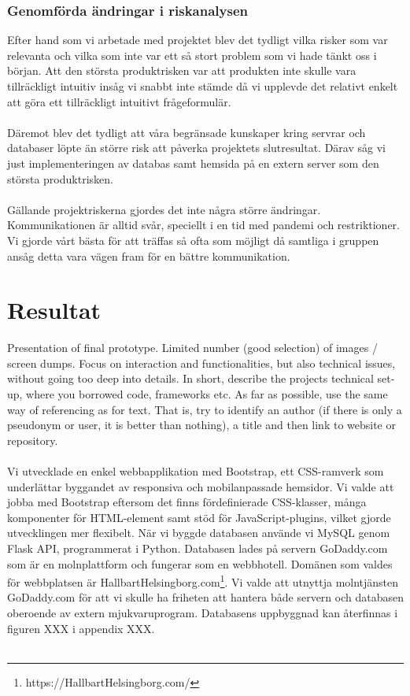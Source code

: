 \documentclass[12pt]{article}
\begin{document}
 \subsubsection{Genomförda ändringar i riskanalysen}Efter hand som vi arbetade med projektet blev det tydligt vilka risker som var relevanta och vilka som inte var ett så stort problem som vi hade tänkt oss i början. Att den största produktrisken var att produkten inte skulle vara tillräckligt intuitiv insåg vi snabbt inte stämde då vi upplevde det relativt enkelt att göra ett tillräckligt intuitivt frågeformulär.\\\\
 Däremot blev det tydligt att våra begränsade kunskaper kring servrar och databaser löpte än större risk att påverka projektets slutresultat. Därav såg vi just implementeringen av databas samt hemsida på en extern server som den största produktrisken.\\\\
 Gällande projektriskerna gjordes det inte några större ändringar. Kommunikationen är alltid svår, speciellt i en tid med pandemi och restriktioner. Vi gjorde vårt bästa för att träffas så ofta som möjligt då samtliga i gruppen ansåg detta vara vägen fram för en bättre kommunikation. 
 

 



\section{Resultat}
Presentation of final prototype. Limited number (good selection) of images / screen dumps. Focus on interaction and functionalities, but also technical issues, without going too deep into details. In short, describe the projects technical set-up, where you borrowed code, frameworks etc. As far as possible, use the same way of referencing as for text. That is, try to identify an author (if there is only a pseudonym or user, it is better than nothing), a title and then link to website or repository.\\\\

Vi utvecklade en enkel webbapplikation med Bootstrap, ett CSS-ramverk som underlättar byggandet av responsiva och mobilanpassade hemsidor. Vi valde att jobba med Bootstrap eftersom det finns fördefinierade CSS-klasser, många komponenter för HTML-element samt stöd för JavaScript-plugins, vilket gjorde utvecklingen mer flexibelt. När vi byggde databasen använde vi MySQL genom Flask API, programmerat i Python. Databasen lades på servern GoDaddy.com som är en molnplattform och fungerar som en webbhotell. Domänen som valdes för webbplatsen är HallbartHelsingborg.com\footnote{https://HallbartHelsingborg.com/}. Vi valde att utnyttja molntjänsten GoDaddy.com för att vi skulle ha friheten att hantera både servern och databasen oberoende av extern mjukvaruprogram. Databasens uppbyggnad kan återfinnas i figuren XXX i appendix XXX.\\\\
\end{document}
